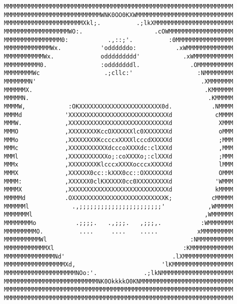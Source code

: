 \thispagestyle{empty}
\begin{Verbatim}[fontsize=\scriptsize]
MMMMMMMMMMMMMMMMMMMMMMMMMMMMMMMMMMMMMMMMMMMMMMMMMMMMMMMMMMMMMMMM
MMMMMMMMMMMMMMMMMMMMMMMMMMMWNK0OO0KXWMMMMMMMMMMMMMMMMMMMMMMMMMMM
MMMMMMMMMMMMMMMMMMMMMMXkl;.          .;lkXMMMMMMMMMMMMMMMMMMMMMM
MMMMMMMMMMMMMMMMMMWO:.                    .cOWMMMMMMMMMMMMMMMMMM
MMMMMMMMMMMMMMMM0:           .,::;'.          :0MMMMMMMMMMMMMMMM
MMMMMMMMMMMMMWx.           'oddddddo:           .xWMMMMMMMMMMMMM
MMMMMMMMMMMWx.             oddddddddd'            .xWMMMMMMMMMMM
MMMMMMMMMM0.               :odddddddl.              .OMMMMMMMMMM
MMMMMMMMWc                  .;cllc:'                  :NMMMMMMMM
MMMMMMMN'                                              .XMMMMMMM
MMMMMMX.                                                .KMMMMMM
MMMMMN.                                                  .KMMMMM
MMMMW,            :OKXXXXXXXXXXXXXXXXXXXXXXX0d.           .NMMMM
MMMMd            'XXXXXXXXXXXXXXXXXXXXXXXXXXXXd            cMMMM
MMMW.            ,XXXXXXXXXXXXXXXXXXXXXXXXXXXXd             XMMM
MMMO             ,XXXXXXXXKccOXXXXXXlc0XXXXXXXd             oMMM
MMMo             ,XXXXXXXXKccccxXXXXlcccdXXXXXd             ;MMM
MMMc             ,XXXXXXXXXXXdcccoXXXXdc:clXXXd             ,MMM
MMMl             ,XXXXXXXXXXXo;:coXXXXo;:clXXXd             ;MMM
MMMx             ,XXXXXXXXKlcccxXXXXocccxXXXXXd             lMMM
MMMX             ,XXXXXX0cc::kXXX0cc::OXXXXXXXd             OMMM
MMMM:            ,XXXXXX0clKXXXXX0cc0XXXXXXXXXd            'WMMM
MMMMX            ,XXXXXXXXXXXXXXXXXXXXXXXXXXXXd            kMMMM
MMMMMd           .OXXXXXXXXXXXXXXXXXXXXXXXXXXK;           cMMMMM
MMMMMMl            .,;;;;;;;;;;;;;;;;;;;;;;;'            ,WMMMMM
MMMMMMMl                                                ,WMMMMMM
MMMMMMMMo           .;;;;.   .,;;;.   ,;;;,.           :WMMMMMMM
MMMMMMMMMO.          ....     ....    .....           xMMMMMMMMM
MMMMMMMMMMWl                                        :NMMMMMMMMMM
MMMMMMMMMMMMXl                                    :KMMMMMMMMMMMM
MMMMMMMMMMMMMMNd'                              .lXMMMMMMMMMMMMMM
MMMMMMMMMMMMMMMMMXd,                        'lKMMMMMMMMMMMMMMMMM
MMMMMMMMMMMMMMMMMMMMNOo:'.             .;lkNMMMMMMMMMMMMMMMMMMMM
MMMMMMMMMMMMMMMMMMMMMMMMMMNK0OkkkkO0KNMMMMMMMMMMMMMMMMMMMMMMMMMM
MMMMMMMMMMMMMMMMMMMMMMMMMMMMMMMMMMMMMMMMMMMMMMMMMMMMMMMMMMMMMMMM
MMMMMMMMMMMMMMMMMMMMMMMMMMMMMMMMMMMMMMMMMMMMMMMMMMMMMMMMMMMMMMMM
\end{Verbatim}
